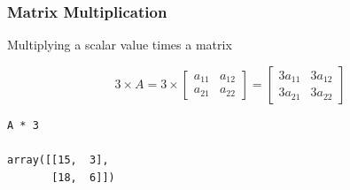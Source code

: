  \begin{frame}[fragile] \frametitle{Matrix Multiplication}

Multiplying a scalar value times a matrix

\begin{equation}
3 \times A = 3 \times \begin{bmatrix} a_{11} & a_{12} \\ a_{21} & a_{22}
\end{bmatrix}
=
\begin{bmatrix}
  3a_{11} & 3a_{12} \\
  3a_{21} & 3a_{22}
\end{bmatrix}
\end{equation}


\begin{lstlisting}
A * 3

array([[15,  3],
       [18,  6]])
\end{lstlisting}

\end{frame}

